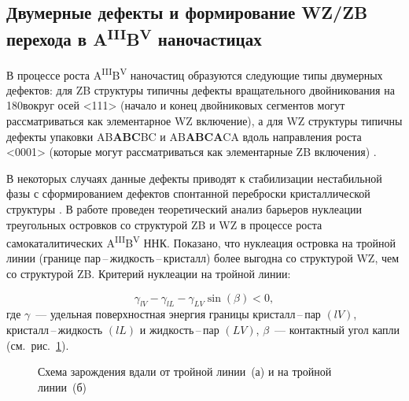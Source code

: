 \subsection{Двумерные дефекты и формирование WZ/ZB перехода в A\textsuperscript{III}B\textsuperscript{V} наночастицах}\label{subsec:ch1/sec2/sub5}

В процессе роста A\textsuperscript{III}B\textsuperscript{V} наночастиц образуются следующие типы двумерных дефектов:  для ZB структуры типичны дефекты вращательного двойникования на 180\textdegree вокруг осей <111> (начало и конец двойниковых сегментов могут рассматриваться как элементарное WZ включение), а для WZ структуры типичны дефекты упаковки AB\textbf{ABC}BC и AB\textbf{ABCA}CA вдоль направления роста <0001> (которые могут рассматриваться как элементарные ZB включения) \cite{knoll2014}.

В некоторых случаях данные дефекты приводят к стабилизации нестабильной фазы с сформированием дефектов спонтанной переброски кристаллической структуры \cite{Cirlin2010}. В работе \cite{Glas2007} проведен теоретический анализ барьеров нуклеации треугольных островков со структурой ZB и WZ в процессе роста самокаталитических A\textsuperscript{III}B\textsuperscript{V} ННК. Показано, что нуклеация островка на тройной линии (границе пар\,--\,жидкость\,--\,кристалл) более выгодна со структурой WZ, чем со структурой ZB. Критерий нуклеации на тройной линии:

\begin{equation}
	\label{eq:eq_1}
	\gamma_{lV} - \gamma_{lL} - \gamma_{LV} \sin(\beta) < 0,
\end{equation}
где \(\gamma\)~--- удельная поверхностная энергия границы кристалл\,--\,пар \((lV)\), кристалл\,--\,жидкость \((lL)\) и жидкость\,--\,пар \((LV)\), \(\beta\)~--- контактный угол капли (см.~рис.~\cref{fig:Image_7}).

\begin{figure}[ht]
	\caption{Схема зарождения вдали от тройной линии~(а) и на тройной линии~(б) \cite{Glas2007}}\label{fig:Image_7}
\end{figure}

